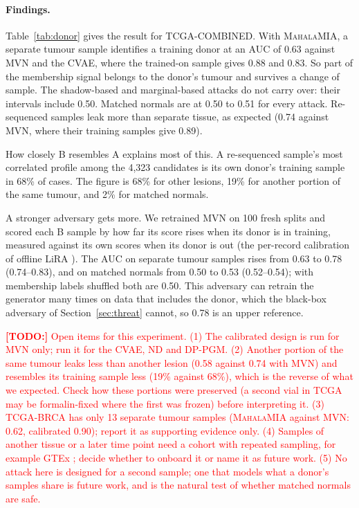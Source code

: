 \documentclass[webpdf,contemporary,large]{oup-authoring-template}
\newif\ifdraft \drafttrue
\newcommand{\annot}[3]{\ifdraft\textcolor{#1}{\textbf{[#2:]} #3}\fi}
\newcommand{\todo}[1]{\annot{red}{TODO}{#1}}
\newcommand{\mahala}{\textsc{MahalaMIA}}
\begin{document}
\begin{appendices}
\paragraph{Findings.}
Table~\ref{tab:donor} gives the result for TCGA-COMBINED. With \mahala{}, a separate tumour sample identifies a training donor at an AUC of 0.63 against MVN and the CVAE, where the trained-on sample gives 0.88 and 0.83. So part of the membership signal belongs to the donor's tumour and survives a change of sample. The shadow-based and marginal-based attacks do not carry over: their intervals include 0.50. Matched normals are at 0.50 to 0.51 for every attack. Re-sequenced samples leak more than separate tissue, as expected (0.74 against MVN, where their training samples give 0.89).

How closely B resembles A explains most of this. A re-sequenced sample's most correlated profile among the 4{,}323 candidates is its own donor's training sample in 68\% of cases. The figure is 68\% for other lesions, 19\% for another portion of the same tumour, and 2\% for matched normals.

A stronger adversary gets more. We retrained MVN on 100 fresh splits and scored each B sample by how far its score rises when its donor is in training, measured against its own scores when its donor is out (the per-record calibration of offline LiRA \citep{carlini2022membership}). The AUC on separate tumour samples rises from 0.63 to 0.78 (0.74--0.83), and on matched normals from 0.50 to 0.53 (0.52--0.54); with membership labels shuffled both are 0.50. This adversary can retrain the generator many times on data that includes the donor, which the black-box adversary of Section~\ref{sec:threat} cannot, so 0.78 is an upper reference.

\todo{Open items for this experiment. (1) The calibrated design is run for MVN only; run it for the CVAE, ND and DP-PGM. (2) Another portion of the same tumour leaks less than another lesion (0.58 against 0.74 with MVN) and resembles its training sample less (19\% against 68\%), which is the reverse of what we expected. Check how these portions were preserved (a second vial in TCGA may be formalin-fixed where the first was frozen) before interpreting it. (3) TCGA-BRCA has only 13 separate tumour samples (\mahala{} against MVN: 0.62, calibrated 0.90); report it as supporting evidence only. (4) Samples of another tissue or a later time point need a cohort with repeated sampling, for example GTEx \citep{gtex2020}; decide whether to onboard it or name it as future work. (5) No attack here is designed for a second sample; one that models what a donor's samples share is future work, and is the natural test of whether matched normals are safe.}


\end{appendices}
\end{document}

